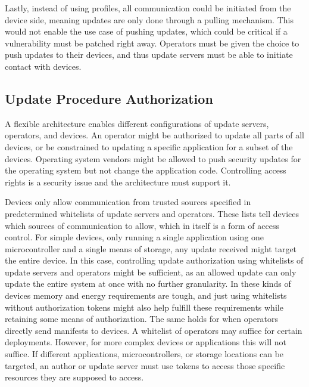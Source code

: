 \documentclass[0-thesis.tex]{subfiles}
\begin{document}
Lastly, instead of using profiles, all communication could be initiated from the device
side, meaning updates are only done through a pulling mechanism. This would not enable the
use case of pushing updates, which could be critical if a vulnerability must be patched
right away. Operators must be given the choice to push updates to their devices, and thus
update servers must be able to initiate contact with devices.

\subsection{Update Procedure Authorization}
\label{ssec:authorization}
A flexible architecture enables different configurations of update servers, operators, and
devices. An operator might be authorized to update all parts of all devices, or be
constrained to updating a specific application for a subset of the devices. Operating
system vendors might be allowed to push security updates for the operating system but not
change the application code. Controlling access rights is a security issue and the
architecture must support it.

Devices only allow communication from trusted sources specified in predetermined
whitelists of update servers and operators. These lists tell devices which sources of
communication to allow, which in itself is a form of access control. For simple devices,
only running a single application using one microcontroller and a single means of storage,
any update received might target the entire device. In this case, controlling update
authorization using whitelists of update servers and operators might be sufficient, as an
allowed update can only update the entire system at once with no further granularity. In
these kinds of devices memory and energy requirements are tough, and just using
whitelists without authorization tokens might also help fulfill these requirements while
retaining some means of authorization. The same holds for when operators directly send
manifests to devices. A whitelist of operators may suffice for certain deployments.
However, for more complex devices or applications this will not suffice. If different
applications, microcontrollers, or storage locations can be targeted, an author or update
server must use tokens to access those specific resources they are supposed to access.
\end{document}
